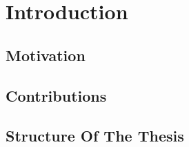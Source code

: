 \chapter{Introduction}
\section{Motivation}
\section{Contributions}
\section{Structure Of The Thesis}